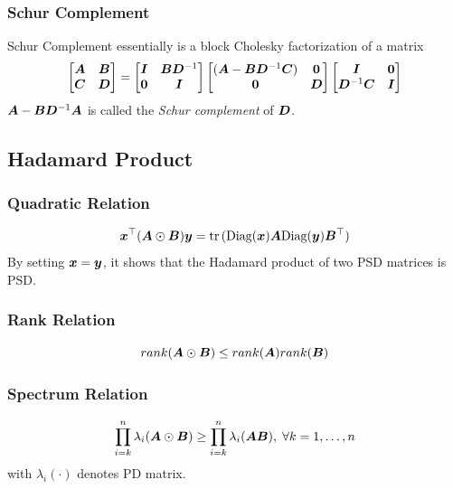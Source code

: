 \documentclass[10pt]{article}
\begin{document}
\subsubsection{Schur Complement}
Schur Complement essentially is a block Cholesky factorization of a matrix 
\begin{equation}
    \begin{bmatrix}
        {\bm{A}} & {\bm{B}} \\ 
        {\bm{C}} & {\bm{D}}  
    \end{bmatrix}
    = \begin{bmatrix}
        {\bm{I}} & {\bm{B}} {\bm{D}}^{-1} \\ 
        \bm{0} & {\bm{I}} 
    \end{bmatrix}
    \begin{bmatrix}
        ({\bm{A}} - {\bm{B}} {\bm{D}}^{-1}{\bm{C}})  & \bm{0} \\ 
        \bm{0} & {\bm{D}} 
    \end{bmatrix}
    \begin{bmatrix}
        {\bm{I}} &  \bm{0} \\ 
        {\bm{D}}^{-1} {\bm{C}} & {\bm{I}} 
    \end{bmatrix}
\end{equation}
${\bm{A}} - {\bm{B}} {\bm{D}}^{-1} {\bm{A}}$ is called the \emph{Schur complement} of ${\bm{D}}$.
\subsection{Hadamard Product}
\subsubsection{Quadratic Relation}
\begin{equation}
    {\bm{x}}^{\top} ({\bm{A}} \odot {\bm{B}}) {\bm{y}} = \mathrm{tr}\,(\text{Diag}({\bm{x}}) {\bm{A}} \text{Diag}({\bm{y}}) {\bm{B}}^{\top})
\end{equation}
By setting ${\bm{x}} = {\bm{y}}$, it shows that the Hadamard product of two PSD matrices is PSD. 
\subsubsection{Rank Relation}
\begin{equation}
    rank({\bm{A}} \odot {\bm{B}}) \leq rank({\bm{A}}) rank ({\bm{B}}) 
\end{equation}
\subsubsection{Spectrum Relation}
\begin{equation}
    \prod_{i=k}^n \lambda_i ({\bm{A}} \odot {\bm{B}}) \geq \prod_{i=k}^n \lambda_i ({\bm{A}} {\bm{B}}), \; \forall k=1, \dots, n 
\end{equation}
with $\lambda_i(\cdot)$ denotes PD matrix. 
\end{document}
